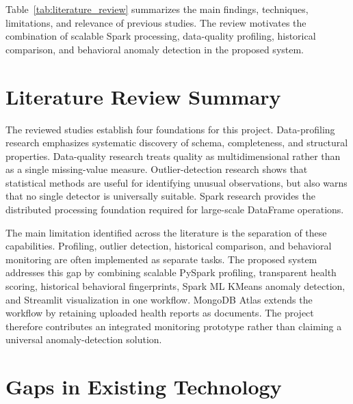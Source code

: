 \documentclass[12pt,a4paper]{report}
\begin{document}
Table~\ref{tab:literature_review} summarizes the main findings, techniques, limitations, and relevance of previous studies. The review motivates the combination of scalable Spark processing, data-quality profiling, historical comparison, and behavioral anomaly detection in the proposed system.

\section{Literature Review Summary}

The reviewed studies establish four foundations for this project. Data-profiling research emphasizes systematic discovery of schema, completeness, and structural properties. Data-quality research treats quality as multidimensional rather than as a single missing-value measure. Outlier-detection research shows that statistical methods are useful for identifying unusual observations, but also warns that no single detector is universally suitable. Spark research provides the distributed processing foundation required for large-scale DataFrame operations.

The main limitation identified across the literature is the separation of these capabilities. Profiling, outlier detection, historical comparison, and behavioral monitoring are often implemented as separate tasks. The proposed system addresses this gap by combining scalable PySpark profiling, transparent health scoring, historical behavioral fingerprints, Spark ML KMeans anomaly detection, and Streamlit visualization in one workflow. MongoDB Atlas extends the workflow by retaining uploaded health reports as documents. The project therefore contributes an integrated monitoring prototype rather than claiming a universal anomaly-detection solution.


\section{Gaps in Existing Technology}
\end{document}
